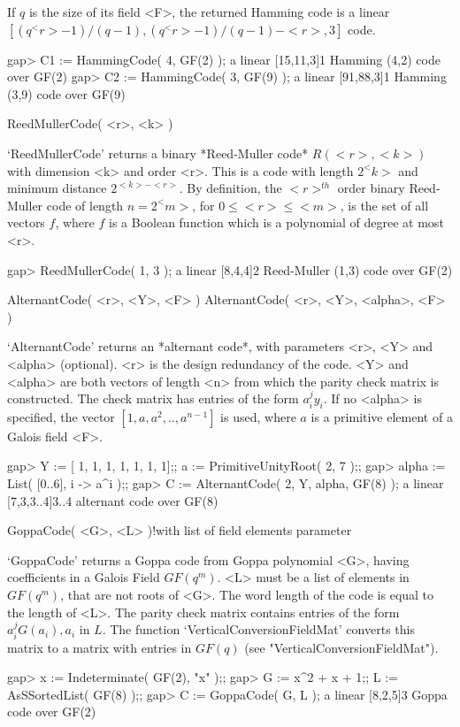 If  $q$ is the  size  of its field  <F>,  the returned  Hamming code is a
linear\ $[(q^<r>-1)/(q-1), (q^<r>-1)/(q-1) - <r>, 3]$ code.

\beginexample
gap> C1 := HammingCode( 4, GF(2) );
a linear [15,11,3]1 Hamming (4,2) code over GF(2)
gap> C2 := HammingCode( 3, GF(9) );
a linear [91,88,3]1 Hamming (3,9) code over GF(9) 
\endexample

\>ReedMullerCode( <r>, <k> )

`ReedMullerCode' returns a binary  *Reed-Muller code* $R(<r>, <k>)$  with
dimension <k>  and  order <r>.  This  is a code  with  length $2^<k>$ and
minimum  distance  $2^{<k>-<r>}$. By   definition, the  $<r>^{th}$  order
binary Reed-Muller  code of length $n=2^<m>$, for  $0 \leq <r> \leq <m>$,
is the set of all vectors $f$, where $f$ is a Boolean function which is a
polynomial of degree at most <r>.

\beginexample
gap> ReedMullerCode( 1, 3 );
a linear [8,4,4]2 Reed-Muller (1,3) code over GF(2) 
\endexample

\>AlternantCode( <r>, <Y>, <F> )
\>AlternantCode( <r>, <Y>, <alpha>, <F> )

`AlternantCode' returns an *alternant code*, with parameters <r>, <Y> and
<alpha> (optional).  <r> is the  design redundancy of   the code. <Y> and
<alpha> are both vectors of length <n> from which the parity check matrix
is constructed. The check matrix has entries of the form $a_i^j y_i$.  If
no <alpha> is specified, the  vector $[1, a,  a^2, .., a^{n-1}]$ is used,
where $a$ is a primitive element of a Galois field <F>.

\beginexample
gap> Y := [ 1, 1, 1, 1, 1, 1, 1];; a := PrimitiveUnityRoot( 2, 7 );;
gap> alpha := List( [0..6], i -> a^i );;
gap> C := AlternantCode( 2, Y, alpha, GF(8) );
a linear [7,3,3..4]3..4 alternant code over GF(8) 
\endexample

\>GoppaCode( <G>, <L> )!{with list of field elements parameter}

`GoppaCode'   returns a  Goppa  code  from  Goppa  polynomial <G>, having
coefficients in a Galois Field $GF(q^m)$. <L> must  be a list of elements
in $GF(q^m)$, that are not roots of <G>.  The word length  of the code is
equal to the length of  <L>. The parity check  matrix contains entries of
the       form   $a_i^j   G(a_i),    a_i$      in  $L$.   The   function
`VerticalConversionFieldMat' converts   this  matrix  to  a  matrix  with
entries in $GF(q)$ (see "VerticalConversionFieldMat").

\beginexample
gap> x := Indeterminate( GF(2), "x" );; 
gap> G := x^2 + x + 1;; L := AsSSortedList( GF(8) );;
gap> C := GoppaCode( G, L );
a linear [8,2,5]3 Goppa code over GF(2) 
\endexample

